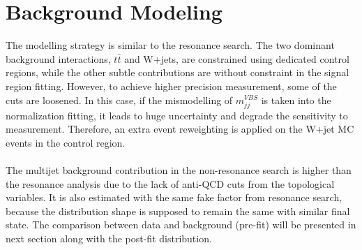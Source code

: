 \section{Background Modeling}
The  modelling strategy is similar to the resonance search. The two dominant background interactions, $t\bar{t}$ and W+jets, are constrained using dedicated control regions, while the other subtle contributions are without constraint in the signal region fitting. However, to achieve higher precision measurement, some of the cuts are loosened. In this case, if the mismodelling of $m^{VBS}_{jj}$ is taken into the normalization fitting, it leads to huge uncertainty and degrade the sensitivity to measurement. Therefore, an extra event reweighting is applied on the W+jet MC events in the control region.
\\
\\The multijet background contribution in the non-resonance search is higher than the resonance analysis due to the lack of anti-QCD cuts from the topological variables. It is also estimated with the same fake factor from resonance search, because the distribution shape is supposed to remain the same with similar final state. The comparison between data and background (pre-fit) will be presented in next section along with the post-fit distribution. 
